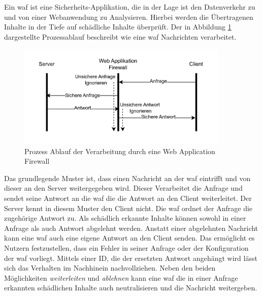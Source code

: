 \label{sec:waf-theory}
Ein \ac{waf} ist eine Sicherheits-Applikation, die in der Lage ist den Datenverkehr zu und von einer Webanwendung zu Analysieren.
Hierbei werden die Übertragenen Inhalte in der Tiefe auf schädliche Inhalte überprüft.
Der in Abbildung \ref{fig:waf-porcess-flow} dargestellte Prozessablauf beschreibt wie eine \ac{waf} Nachrichten verarbeitet.

\begin{figure}[!hbt]
    \centering
    \includegraphics[width=0.9\textwidth]{./images/Waf-Process-fliow.png}
    \caption{Prozess Ablauf der Verarbeitung durch eine Web Application Firewall}
    \label{fig:waf-porcess-flow}
\end{figure}

Das grundlegende Muster ist, dass einen Nachricht an der \ac{waf} eintrifft und von dieser an den Server weitergegeben wird.
Dieser Verarbeitet die Anfrage und sendet seine Antwort an die \ac{waf} die die Antwort an den Client weiterleitet.
Der Server kennt in diesem Muster den Client nicht.
Die \ac{waf} ordnet der Anfrage die zugehörige Antwort zu.
Als schädlich erkannte Inhalte können sowohl in einer Anfrage als auch Antwort abgelehnt werden.
Anstatt einer abgelehnten Nachricht kann eine \ac{waf} auch eine eigene Antwort an den Client senden.
Das ermöglicht es Nutzern festzustellen, dass ein Fehler in seiner Anfrage oder der Konfiguration der \ac{waf} vorliegt.
Mittels einer ID, die der ersetzten Antwort angehängt wird lässt sich das Verhalten im Nachhinein nachvollziehen.
Neben den beiden Möglichkeiten \textit{weiterleiten} und \textit{ablehnen} kann eine \ac{waf} die in einer Anfrage erkannten schädlichen Inhalte auch neutralisieren und die Nachricht weitergeben\cite{schmitzGrundlagenWebApplication2018}.\\

